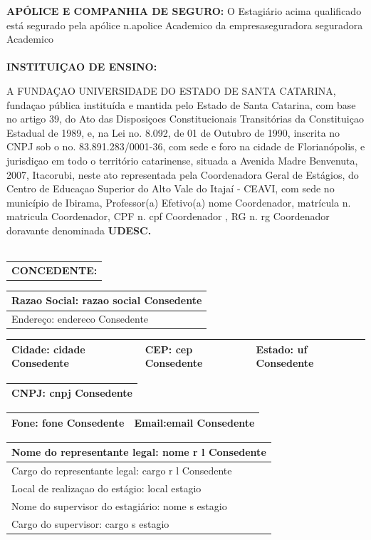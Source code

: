 \documentclass[10pt,a4paper]{article}
\begin{document}
\textbf{APÓLICE E COMPANHIA DE SEGURO: }O Estagiário acima qualificado 
está segurado pela apólice n.apolice Academico  da empresaseguradora seguradora Academico
\\
\\

\textbf{INSTITUIÇAO DE ENSINO:}

A FUNDAÇAO UNIVERSIDADE DO ESTADO DE SANTA CATARINA, fundaçao pública 
instituída e mantida pelo Estado de Santa Catarina, com base no artigo 
39, do Ato das Disposiçoes Constitucionais Transitórias da Constituiçao 
Estadual de 1989, e, na Lei no. 8.092, de 01 de Outubro de 1990, 
inscrita no CNPJ sob o no. 83.891.283/0001-36, com sede e foro na cidade 
de Florianópolis, e jurisdiçao em todo o território catarinense, situada 
a Avenida Madre Benvenuta, 2007, Itacorubi, neste ato representada pela 
Coordenadora Geral de Estágios, do Centro de Educaçao Superior do Alto 
Vale do Itajaí - CEAVI, com sede no município de Ibirama, Professor(a) 
Efetivo(a) nome Coordenador, matrícula n. matricula Coordenador, CPF n. cpf Coordenador , RG n. rg Coordenador doravante denominada \textbf{
UDESC.}
\\
\\


\begin{table}[h]
\begin{tabular*}{1\textwidth}{p{16cm}}
\textbf{CONCEDENTE:}
\end{tabular*}
\centering

\begin{tabular*}{1\textwidth}{l}
Razao Social: razao social Consedente \\
\hline
Endereço: endereco Consedente \\
\hline
\end{tabular*}
\begin{tabular*}{1\textwidth}{p{10cm}p{3cm}p{3cm}}
Cidade: cidade Consedente &CEP: cep Consedente &Estado: uf Consedente \\
\hline
\end{tabular*}

\begin{tabular*}{1\textwidth}{l}
CNPJ: cnpj Consedente\\
\hline
\end{tabular*}

\begin{tabular*}{1\textwidth}{p{6cm}p{10cm}}
Fone: fone Consedente & Email:email Consedente \\
\hline
\end{tabular*}

\begin{tabular*}{1\textwidth}{l}
Nome do representante legal: nome r l  Consedente \\
\hline
Cargo do representante legal: cargo r l Consedente \\
\hline
Local de realizaçao do estágio: local estagio \\
\hline
Nome do supervisor do estagiário: nome s estagio \\
\hline
Cargo do supervisor: cargo s estagio\\
\hline
\end{tabular*}
\end{table}
\end{document}

